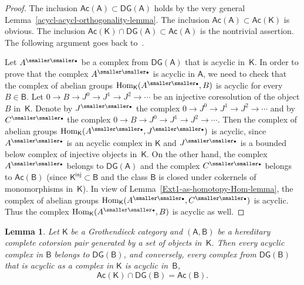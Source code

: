 \documentclass[12pt,a4paper]{amsart}
\newcommand{\+}{\nobreakdash-}
\renewcommand{\:}{\colon}
\newcommand{\rarrow}{\longrightarrow}
\newcommand{\bu}{{\text{\smaller\smaller$\scriptstyle\bullet$}}}
\DeclareMathOperator{\Hom}{Hom}
\newcommand{\sA}{\mathsf A}
\newcommand{\sB}{\mathsf B}
\newcommand{\sK}{\mathsf K}
\newcommand{\Ac}{\mathsf{Ac}}
\newcommand{\DG}{\mathsf{DG}}
\newcommand{\inj}{\mathsf{inj}}
\theoremstyle{plain}
\newtheorem{lem}[thm]{Lemma}
\theoremstyle{definition}
\begin{document}
\begin{proof}
 The inclusion $\Ac(\sA)\subset\DG(\sA)$ holds by the very general
Lemma~\ref{acycl-acycl-orthogonality-lemma}.
 The inclusion $\Ac(\sA)\subset\Ac(\sK)$ is obvious.
 The inclusion $\Ac(\sK)\cap\DG(\sA)\subset\Ac(\sA)$ is the nontrivial
assertion.
 The following argument goes back to~\cite[Theorem~3.12]{Gil}.

 Let $A^\bu$ be a complex from $\DG(\sA)$ that is acyclic in~$\sK$.
 In order to prove that the complex $A^\bu$ is acyclic in $\sA$, we
need to check that the complex of abelian groups $\Hom_\sK(A^\bu,B)$
is acyclic for every $B\in\sB$.
 Let $0\rarrow B\rarrow J^0\rarrow J^1\rarrow J^2\rarrow\dotsb$ be
an injective coresolution of the object $B$ in~$\sK$.
 Denote by $J^\bu$ the complex $0\rarrow J^0\rarrow J^1\rarrow J^2
\rarrow\dotsb$ and by $C^\bu$ the complex $0\rarrow B\rarrow J^0
\rarrow J^1\rarrow J^2\rarrow\dotsb$.
 Then the complex of abelian groups $\Hom_\sK(A^\bu,J^\bu)$ is acyclic,
since $A^\bu$ is an acyclic complex in $\sK$ and $J^\bu$ is a bounded
below complex of injective objects in~$\sK$.
 On the other hand, the complex $A^\bu$ belongs to $\DG(\sA)$ and
the complex $C^\bu$ belongs to $\Ac(\sB)$ (since $\sK^\inj\subset\sB$
and the class $\sB$ is closed under cokernels of monomorphisms
in~$\sK$).
 In view of Lemma~\ref{Ext1-as-homotopy-Hom-lemma}, the complex
of abelian groups $\Hom_\sK(A^\bu,C^\bu)$ is acyclic.
 Thus the complex $\Hom_\sK(A^\bu,B)$ is acyclic as well.
\end{proof}

\begin{lem} \label{DG-B-intersect-Ac-K-is-Ac-B}
 Let\/ $\sK$ be a Grothendieck category and $(\sA,\sB)$ be a hereditary
complete cotorsion pair generated by a set of objects in\/~$\sK$.
 Then every acyclic complex in\/ $\sB$ belongs to\/ $\DG(\sB)$, and
conversely, every complex from\/ $\DG(\sB)$ that is acyclic as
a complex in\/ $\sK$ is acyclic in\/~$\sB$,
$$
 \Ac(\sK)\cap\DG(\sB)=\Ac(\sB).
$$
\end{lem}
\end{document}
